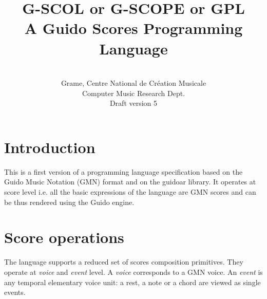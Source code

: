 \documentclass[10pt,a4paper,frenchb]{article}
\begin{document}
\title{\textbf{\textsc{G-SCOL}} or \textbf{\textsc{G-SCOPE}} or \textbf{\textsc{GPL}} \\
A Guido Scores Programming Language}


\author{
\\
Grame, Centre National de Création Musicale \\
Computer Music Research Dept.\\
Draft version 5
}

\maketitle

\section{Introduction}

This is a first version of a programming language specification based on the Guido Music Notation (GMN) format and on the guidoar library. It operates at score level i.e. all the basic expressions of the language are GMN scores and can be thus rendered using the Guido engine. 


\section{Score operations}

The language supports a reduced set of scores composition primitives.
They operate at \emph{voice} and \emph{event} level. 
A \emph{voice} corresponds to a GMN voice.
An \emph{event} is any temporal elementary voice unit: a rest, a note or a chord are viewed as single events.
\end{document}
